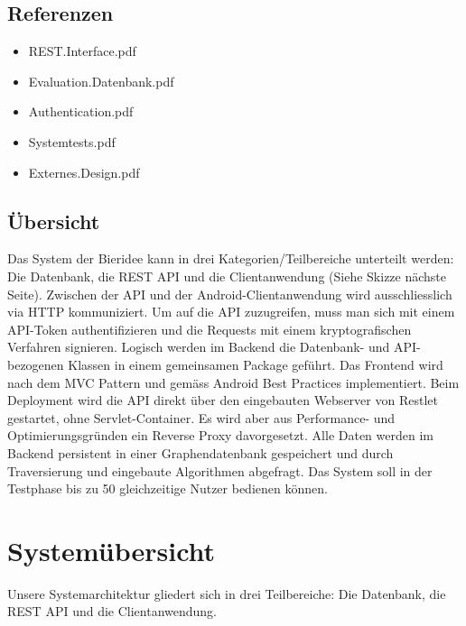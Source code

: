 \documentclass[10pt,a4paper]{scrartcl}
\begin{document}
\subsection{Referenzen}

\begin{itemize}
	\item REST.Interface.pdf
	\item Evaluation.Datenbank.pdf
	\item Authentication.pdf
	\item Systemtests.pdf
	\item Externes.Design.pdf
\end{itemize}

%
%

\subsection{Übersicht}

Das System der Bieridee kann in drei Kategorien/Teilbereiche unterteilt werden: Die Datenbank, die
REST API und die Clientanwendung (Siehe Skizze nächste Seite). Zwischen der API und der Android-Clientanwendung wird
ausschliesslich via HTTP kommuniziert. Um auf die API zuzugreifen, muss man sich mit einem
API-Token authentifizieren und die Requests mit einem kryptografischen Verfahren signieren. 
Logisch werden im Backend die Datenbank- und API-bezogenen Klassen in einem gemeinsamen Package
geführt. Das Frontend wird nach dem MVC Pattern und gemäss Android Best Practices implementiert. 
Beim Deployment wird die API direkt über den eingebauten Webserver von Restlet gestartet, ohne
Servlet-Container. Es wird aber aus Performance- und Optimierungsgründen ein Reverse Proxy
davorgesetzt. Alle Daten werden im Backend persistent in einer Graphendatenbank gespeichert und
durch Traversierung und eingebaute Algorithmen abgefragt. Das System soll in der Testphase bis zu
50 gleichzeitige Nutzer bedienen können.


\newpage
\section{Systemübersicht}
Unsere Systemarchitektur gliedert sich in drei Teilbereiche: Die Datenbank, die REST API
und die Clientanwendung.
\end{document}
